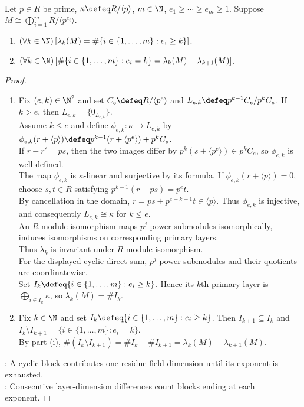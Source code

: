 \begin{proposition} \label{prop:p-primary-layer-counts-recover-exponents} \\
Let $p\in R$ be prime, $\kappa\defeq R/\langle p\rangle$, $m\in\N$, $e_1\geq\cdots\geq e_m\geq1$. Suppose $M\cong\bigoplus\limits_{i=1}^mR/\langle p^{e_i}\rangle$.
\begin{enumerate}[label=(\roman*)]
\setlength{\itemsep}{0pt}
\item $(\forall k\in\N)\,[\lambda_k(M)=\#\{i\in\{1,\ldots,m\}:e_i\geq k\}]$.
\item $(\forall k\in\N)\,[\#\{i\in\{1,\ldots,m\}:e_i=k\}=\lambda_k(M)-\lambda_{k+1}(M)]$.
\end{enumerate}
\begin{proof}
\begin{enumerate}[label=(\roman*)]
\setlength{\itemsep}{0pt}
\item Fix $(e,k)\in\N^2$ and set $C_e\defeq R/\langle p^e\rangle$ and $L_{e,k}\defeq p^{k-1}C_e/p^kC_e$. If $k>e$, then $L_{e,k}=\{0_{L_{e,k}}\}$.\\
Assume $k\leq e$ and define $\phi_{e,k}:\kappa\to L_{e,k}$ by $\phi_{e,k}(r+\langle p\rangle)\defeq p^{k-1}(r+\langle p^e\rangle)+p^kC_e$.\\
If $r-r'=ps$, then the two images differ by $p^k(s+\langle p^e\rangle)\in p^kC_e$, so $\phi_{e,k}$ is well-defined.\\
The map $\phi_{e,k}$ is $\kappa$-linear and surjective by its formula. If $\phi_{e,k}(r+\langle p\rangle)=0$, choose $s,t\in R$ satisfying $p^{k-1}(r-ps)=p^et$.\\
By cancellation in the domain, $r=ps+p^{e-k+1}t\in\langle p\rangle$. Thus $\phi_{e,k}$ is injective, and consequently $L_{e,k}\cong\kappa$ for $k\leq e$.\\
An $R$-module isomorphism maps $p^j$-power submodules isomorphically, induces isomorphisms on corresponding primary layers.\\
Thus $\lambda_k$ is invariant under $R$-module isomorphism.\\
For the displayed cyclic direct sum, $p^j$-power submodules and their quotients are coordinatewise.\\
Set $I_k\defeq\{i\in\{1,\ldots,m\}:e_i\geq k\}$. Hence its $k$th primary layer is $\bigoplus\limits_{i\in I_k}\kappa$, so $\lambda_k(M)=\#I_k$.
\item Fix $k\in\N$ and set $I_k\defeq\{i\in\{1,\ldots,m\}:e_i\geq k\}$. Then $I_{k+1}\subseteq I_k$ and $I_k\setminus I_{k+1}=\{i\in\{1,\ldots,m\}:e_i=k\}$.\\
By part (i), $\#(I_k\setminus I_{k+1})=\#I_k-\#I_{k+1}=\lambda_k(M)-\lambda_{k+1}(M)$.
\end{enumerate}
\noindent
{}: A cyclic block contributes one residue-field dimension until its exponent is exhausted.\\
: Consecutive layer-dimension differences count blocks ending at each exponent.
\end{proof}
\end{proposition}

